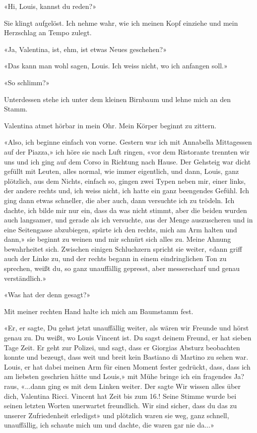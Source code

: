 «Hi, Louis, kannst du reden?»

Sie klingt aufgelöst. Ich nehme wahr, wie ich meinen Kopf einziehe und
mein Herzschlag an Tempo zulegt.

«Ja, Valentina, ist, ehm, ist etwas Neues geschehen?»

«Das kann man wohl sagen, Louis. Ich weiss nicht, wo ich anfangen soll.»

«So schlimm?»

Unterdessen stehe ich unter dem kleinen Birnbaum und lehne mich an den
Stamm.

Valentina atmet hörbar in mein Ohr. Mein Körper beginnt zu zittern.

«Also, ich beginne einfach von vorne. Gestern war ich mit Annabella
Mittagessen auf der Piazza,» ich höre sie nach Luft ringen, «vor dem
Ristorante trennten wir uns und ich ging auf dem Corso in Richtung nach
Hause. Der Gehsteig war dicht gefüllt mit Leuten, alles normal, wie
immer eigentlich, und dann, Louis, ganz plötzlich, aus dem Nichts,
einfach so, gingen zwei Typen neben mir, einer links, der andere rechts
und, ich weiss nicht, ich hatte ein ganz beengendes Gefühl. Ich ging
dann etwas schneller, die aber auch, dann versuchte ich zu trödeln. Ich
dachte, ich bilde mir nur ein, dass da was nicht stimmt, aber die beiden
wurden auch langsamer, und gerade als ich versuchte, aus der Menge
auszuscheren und in eine Seitengasse abzubiegen, spürte ich den rechts,
mich am Arm halten und dann,» sie beginnt zu weinen und mir schnürt sich
alles zu. Meine Ahnung bewahrheitet sich. Zwischen einigen Schluchzern
spricht sie weiter, «dann griff auch der Linke zu, und der rechts begann
in einem eindringlichen Ton zu sprechen, weißt du, so ganz unauffällig
gepresst, aber messerscharf und genau verständlich.»

«Was hat der denn gesagt?»

Mit meiner rechten Hand halte ich mich am Baumstamm fest.

«Er, er sagte, Du gehst jetzt unauffällig weiter, als wären wir Freunde
und hörst genau zu. Du weißt, wo Louis Vincent ist. Du sagst deinem
Freund, er hat sieben Tage Zeit. Er geht zur Polizei, und sagt, dass er
Giorgias Absturz beobachten konnte und bezeugt, dass weit und breit kein
Bastiano di Martino zu sehen war. Louis, er hat dabei meinen Arm für
einen Moment fester gedrückt, dass, dass ich am liebsten geschrien hätte
und Louis,» mit Mühe bringe ich ein fragendes Ja? raus, «...dann ging es
mit dem Linken weiter. Der sagte Wir wissen alles über dich, Valentina
Ricci. Vincent hat Zeit bis zum 16.! Seine Stimme wurde bei seinen
letzten Worten unerwartet freundlich. Wir sind sicher, dass du das zu
unserer Zufriedenheit erledigst» und plötzlich waren sie weg, ganz
schnell, unauffällig, ich schaute mich um und dachte, die waren gar nie
da...»


